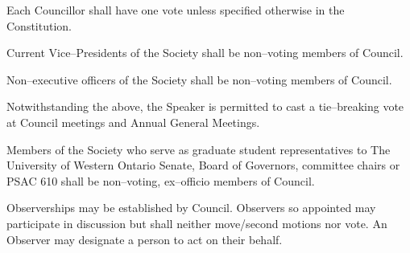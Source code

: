 \begin{longenum}[label*=\thesubsection.\arabic*., align=left]
    \item Each Councillor shall have one vote unless specified otherwise in the Constitution. 
    \item Current Vice--Presidents of the Society shall be non--voting members of Council.
    \item Non--executive officers of the Society shall be non--voting members of Council.
    	\begin{longenum}[label*=\arabic*., align=left]
    \item Notwithstanding the above, the Speaker is permitted to cast a tie--breaking vote at Council meetings and Annual General Meetings.
  	\end{longenum}
    \item Members of the Society who serve as graduate student representatives to The University of Western Ontario Senate, Board of Governors, committee chairs or PSAC 610 shall be non--voting, ex--officio members of Council.
    \item Observerships may be established by Council. Observers so appointed may participate in discussion but shall neither move/second motions nor vote. An Observer may designate a person to act on their behalf. 
\end{longenum}


